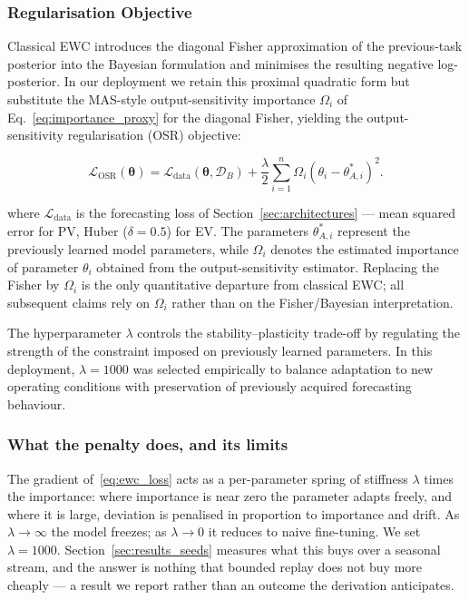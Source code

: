 \documentclass[journal]{IEEEtran}
\newcommand{\loss}{\mathcal{L}}
\newcommand{\params}{\bm{\theta}}
\newcommand{\ewclambda}{\lambda}
\begin{document}
\subsubsection{Regularisation Objective}
\label{sec:ewc_loss}

Classical EWC introduces the diagonal Fisher approximation of the
previous-task posterior into the Bayesian formulation and minimises the
resulting negative log-posterior. In our deployment we retain this
proximal quadratic form but substitute the MAS-style output-sensitivity
importance $\Omega_i$ of Eq.~\eqref{eq:importance_proxy} for the diagonal
Fisher, yielding the output-sensitivity regularisation (OSR) objective:

\begin{equation}
\mathcal{L}_{\mathrm{OSR}}(\params)
=
\mathcal{L}_{\mathrm{data}}(\params,\mathcal{D}_B)
+
\frac{\lambda}{2}
\sum_{i=1}^{n}
\Omega_{i}
(\theta_i-\theta_{A,i}^{*})^2 .
\label{eq:ewc_loss}
\end{equation}

where $\loss_{\mathrm{data}}$ is the forecasting loss of
Section~\ref{sec:architectures} --- mean squared error for PV, Huber
($\delta = 0.5$) for EV. The parameters
$\theta_{A,i}^{*}$ represent the previously learned model parameters,
while $\Omega_{i}$ denotes the estimated importance of parameter
$\theta_i$ obtained from the output-sensitivity estimator. Replacing the
Fisher by $\Omega_i$ is the only quantitative departure from classical
EWC; all subsequent claims rely on $\Omega_i$ rather than on the
Fisher/Bayesian interpretation.

The hyperparameter $\ewclambda$ controls the stability--plasticity
trade-off by regulating the strength of the constraint imposed on
previously learned parameters. In this deployment, $\ewclambda=1000$ was
selected empirically to balance adaptation to new operating conditions
with preservation of previously acquired forecasting behaviour.
\subsubsection{What the penalty does, and its limits}
The gradient of~\eqref{eq:ewc_loss} acts as a per-parameter spring of stiffness
$\ewclambda$ times the importance: where importance is near zero the parameter
adapts freely, and where it is large, deviation is penalised in proportion to
importance and drift. As $\ewclambda \to \infty$ the model freezes; as
$\ewclambda \to 0$ it reduces to naive fine-tuning. We set
$\ewclambda = 1000$. Section~\ref{sec:results_seeds} measures what this buys
over a seasonal stream, and the answer is nothing that bounded replay does not
buy more cheaply --- a result we report rather than an outcome the derivation
anticipates.
\end{document}

